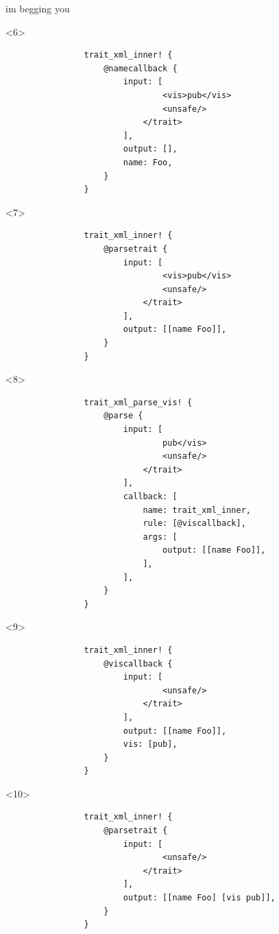 \documentclass{beamer}
\begin{document}
\begin{frame}[fragile]{im begging you}
		\pause

		\begin{onlyenv}<6>
			\begin{verbatim}
				trait_xml_inner! {
					@namecallback {
						input: [
								<vis>pub</vis>
								<unsafe/>
							</trait>
						],
						output: [],
						name: Foo,
					}
				}
			\end{verbatim}
		\end{onlyenv}

		\pause

		\begin{onlyenv}<7>
			\begin{verbatim}
				trait_xml_inner! {
					@parsetrait {
						input: [
								<vis>pub</vis>
								<unsafe/>
							</trait>
						],
						output: [[name Foo]],
					}
				}
			\end{verbatim}
		\end{onlyenv}

		\pause

		\begin{onlyenv}<8>
			\begin{verbatim}
				trait_xml_parse_vis! {
					@parse {
						input: [
								pub</vis>
								<unsafe/>
							</trait>
						],
						callback: [
							name: trait_xml_inner,
							rule: [@viscallback],
							args: [
								output: [[name Foo]],
							],
						],
					}
				}
			\end{verbatim}
		\end{onlyenv}

		\pause

		\begin{onlyenv}<9>
			\begin{verbatim}
				trait_xml_inner! {
					@viscallback {
						input: [
								<unsafe/>
							</trait>
						],
						output: [[name Foo]],
						vis: [pub],
					}
				}
			\end{verbatim}
		\end{onlyenv}

		\pause

		\begin{onlyenv}<10>
			\begin{verbatim}
				trait_xml_inner! {
					@parsetrait {
						input: [
								<unsafe/>
							</trait>
						],
						output: [[name Foo] [vis pub]],
					}
				}
			\end{verbatim}
		\end{onlyenv}


\end{frame}
\end{document}
